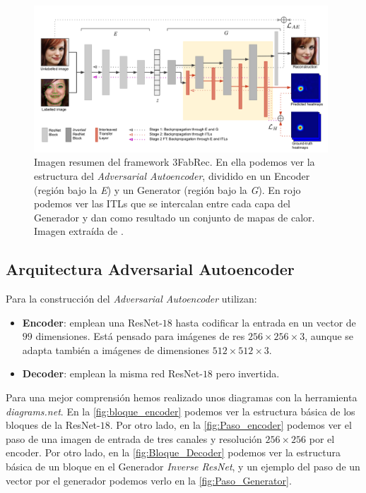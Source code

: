         \begin{figure}[H]
            \centering
            \includegraphics[width=0.98\textwidth]{img/3fabrec_arquitectura.png}
            \caption{Imagen resumen del framework 3FabRec. En ella podemos ver la estructura del \textit{Adversarial Autoencoder}, dividido en un Encoder (región bajo la \textit{E}) y un Generator (región bajo la \textit{G}). En rojo podemos ver las ITLs que se intercalan entre cada capa del Generador y dan como resultado un conjunto de mapas de calor. Imagen extraída de \cite{browatzki20203fabrec}.}
            \label{fig:3FabRec Resumen}
        \end{figure}

        \subsection{Arquitectura Adversarial Autoencoder}
            \noindent Para la construcción del \textit{Adversarial Autoencoder} utilizan:
            
            \begin{itemize}
                \item \textbf{Encoder}: emplean una ResNet-$18$  hasta codificar la entrada en un vector de $99$ dimensiones. Está pensado para imágenes de res $256 \times 256 \times 3$, aunque se adapta también a imágenes de dimensiones $512 \times 512 \times 3$.
                \item \textbf{Decoder}: emplean la misma red ResNet-$18$ pero invertida.
            \end{itemize}

            \noindent Para una mejor comprensión hemos realizado unos diagramas con la herramienta \textit{diagrams.net}. En la \autoref{fig:bloque_encoder} podemos ver la estructura básica de los bloques de la ResNet-$18$. Por otro lado, en la \autoref{fig:Paso_encoder} podemos ver el paso de una imagen de entrada de tres canales y resolución $256 \times 256$ por el encoder. Por otro lado, en la \autoref{fig:Bloque_Decoder} podemos ver la estructura básica de un bloque en el Generador \textit{Inverse ResNet}, y un ejemplo del paso de un vector por el generador podemos verlo en la \autoref{fig:Paso_Generator}. 


